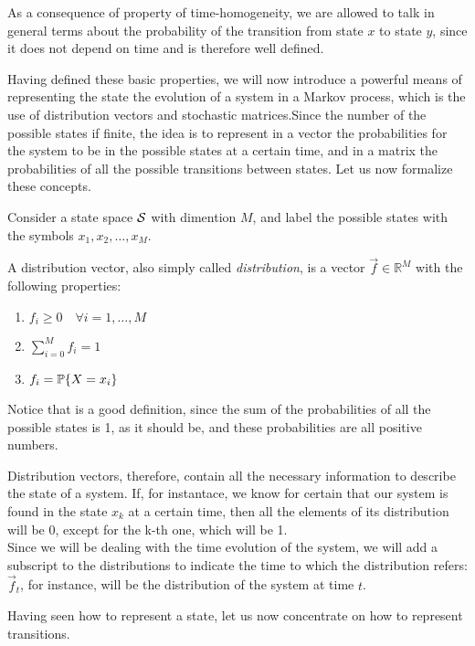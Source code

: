 As a consequence of property of time-homogeneity, we are allowed to talk in general terms about the probability of the transition from state $x$ to state $y$, since it does not depend on time and is therefore well defined.

Having defined these basic properties, we will now introduce a powerful means of representing the state the evolution of a system in a Markov process, which is the use of distribution vectors and stochastic matrices.Since the number of the possible states if finite, the idea is to represent in a vector the probabilities for the system to be in the possible states at a certain time, and in a matrix the probabilities of all the possible transitions between states. Let us now formalize these concepts.

Consider a state space $\mathcal{S}$ with dimention $M$, and label the possible states with the symbols $x_1, x_2, \dots, x_M$.

\begin{ndef}
    A distribution vector, also simply called \emph{distribution}, is a vector $\vec{f} \in \mathbb{R}^M$ with the following properties:
    \begin{center}
        \begin{enumerate}
            \item $f_i \geq 0 \quad \forall i = 1,\dots, M$
            \item $\sum_{i=0}^M f_i = 1$
            \item $f_i = \mathbb{P}\{X = x_i\}$
        \end{enumerate}
    \end{center}
    Notice that is a good definition, since the sum of the probabilities of all the possible states is 1, as it should be, and these probabilities are all positive numbers.
\end{ndef}
Distribution vectors, therefore, contain all the necessary information to describe the state of a system. If, for instantace, we know for certain that our system is found in the state $x_k$ at a certain time, then all the elements of its distribution will be 0, except for the k-th one, which will be 1.\\
Since we will be dealing with the time evolution of the system, we will add a subscript to the distributions to indicate the time to which the distribution refers: $\vec{f}_t$, for instance, will be the distribution of the system at time $t$.

Having seen how to represent a state, let us now concentrate on how to represent transitions.

